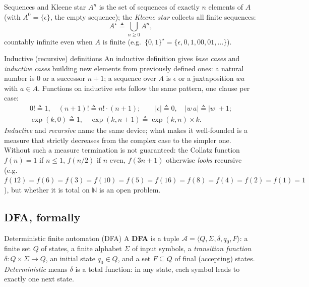 \begin{definitionbox}{Sequences and Kleene star}
$A^n$ is the set of sequences of exactly $n$ elements of $A$ (with $A^0 = \{\epsilon\}$, the empty sequence); the \emph{Kleene star} collects all finite sequences:
\[
  A^\star \triangleq \bigcup_{n \geq 0} A^n,
\]
countably infinite even when $A$ is finite (e.g.\ $\{0,1\}^\star = \{\epsilon, 0, 1, 00, 01, \ldots\}$).
\end{definitionbox}

\begin{definitionbox}{Inductive (recursive) definitions}
An inductive definition gives \emph{base cases} and \emph{inductive cases} building new elements from previously defined ones: a natural number is $0$ or a successor $n+1$; a sequence over $A$ is $\epsilon$ or a juxtaposition $wa$ with $a \in A$. Functions on inductive sets follow the same pattern, one clause per case:
\begin{gather*}
  0! \triangleq 1, \quad (n+1)! \triangleq n! \cdot (n+1); \qquad |\epsilon| \triangleq 0, \quad |w\,a| \triangleq |w| + 1; \\
  \exp(k,0) \triangleq 1, \quad \exp(k,n+1) \triangleq \exp(k,n) \times k.
\end{gather*}
\emph{Inductive} and \emph{recursive} name the same device; what makes it well-founded is a measure that strictly decreases from the complex case to the simpler one. Without such a measure termination is not guaranteed: the Collatz function $f(n) = 1$ if $n \leq 1$, $f(n/2)$ if $n$ even, $f(3n+1)$ otherwise \emph{looks} recursive (e.g.\ $f(12) = f(6) = f(3) = f(10) = f(5) = f(16) = f(8) = f(4) = f(2) = f(1) = 1$), but whether it is total on $\mathbb{N}$ is an open problem.
\end{definitionbox}

\subsection{DFA, formally}

\begin{definitionbox}{Deterministic finite automaton (DFA)}
A \textbf{DFA} is a tuple $\mathcal{A} = \langle Q, \Sigma, \delta, q_0, F \rangle$: a finite set $Q$ of states, a finite alphabet $\Sigma$ of input symbols, a \emph{transition function} $\delta : Q \times \Sigma \to Q$, an initial state $q_0 \in Q$, and a set $F \subseteq Q$ of final (accepting) states. \emph{Deterministic} means $\delta$ is a total function: in any state, each symbol leads to exactly one next state.
\end{definitionbox}

